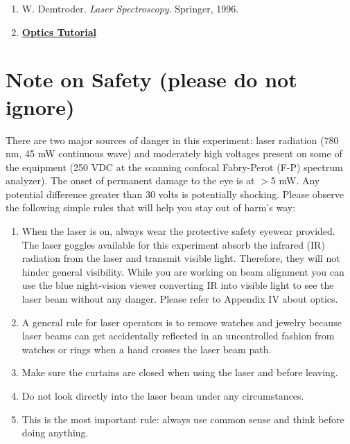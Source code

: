 \documentclass{../lab}
\begin{document}
\begin{enumerate}
    \item W. Demtroder. \emph{Laser Spectroscopy}. Springer, 1996.

    \item \href{http://experimentationlab.berkeley.edu/OpticsTutorial}{\textbf{Optics Tutorial}}

\end{enumerate}

\section{Note on Safety (please do not ignore)}

There are two major sources of danger in this experiment: laser radiation (780 nm, 45 mW continuous wave) and moderately high voltages present on some of the equipment (250 VDC at the scanning confocal Fabry-Perot (F-P) spectrum analyzer). The onset of permanent damage to the eye is at $>$5 mW. Any potential difference greater than 30 volts is potentially shocking. Please observe the following simple rules that will help you stay out of harm's way:

\begin{enumerate}
    \item When the laser is on, always wear the protective safety eyewear provided. The laser goggles available for this experiment absorb the infrared (IR) radiation from the laser and transmit visible light. Therefore, they will not hinder general visibility. While you are working on beam alignment you can use the blue night-vision viewer converting IR into visible light to see the laser beam without any danger. Please refer to Appendix IV about optics.

    \item A general rule for laser operators is to remove watches and jewelry because laser beams can get accidentally reflected in an uncontrolled fashion from watches or rings when a hand crosses the laser beam path.

    \item Make sure the curtains are closed when using the laser and before leaving.

    \item Do not look directly into the laser beam under any circumstances.

    \item This is the most important rule: always use common sense and think before doing anything.

\end{enumerate}
\end{document}
